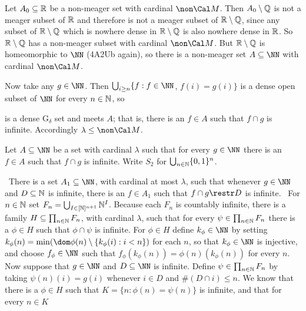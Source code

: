 {\medskip

 Let $A_0\subseteq\Bbb R$ be a non-meager set with cardinal
$\non\Cal M$.   Then $A_0\setminus\Bbb Q$ is not a meager subset of
$\Bbb R$ and therefore is not a meager subset of $\Bbb R\setminus\Bbb Q$,
since any subset of $\Bbb R\setminus\Bbb Q$ which is nowhere dense in
$\Bbb R\setminus\Bbb Q$ is also nowhere dense in $\Bbb R$.   So
$\Bbb R\setminus\Bbb Q$ has a non-meager subset with cardinal $\non\Cal M$.
But $\Bbb R\setminus\Bbb Q$ is homeomorphic to $\NN$ (4A2Ub again),
so there is a non-meager set $A\subseteq\NN$ with cardinal $\non\Cal M$.

Now take any $g\in\NN$.   Then
$\bigcup_{i\ge n}\{f:f\in\NN$, $f(i)=g(i)\}$ is a dense open subset of
$\NN$ for every $n\in\Bbb N$, so


\noindent is a dense G$_{\delta}$ set and meets $A$;  that is, there is an
$f\in A$ such that $f\cap g$ is infinite.   Accordingly
$\lambda\le\non\Cal M$.

\medskip

 Let $A\subseteq\NN$ be a set with cardinal $\lambda$ such that
for every $g\in\NN$
there is an $f\in A$ such that $f\cap g$ is infinite.   Write $S_2$ for
$\bigcup_{n\in\Bbb N}\{0,1\}^n$.

\medskip

\qquad\grheada\ There is a set $A_1\subseteq\NN$, with cardinal at most
$\lambda$, such
that whenever $g\in\NN$ and $D\subseteq\Bbb N$ is infinite, there is
an $f\in A_1$ such that $f\cap g\restr D$ is infinite.
\Prf\ For $n\in\Bbb N$ set $F_n=\bigcup_{I\in[\Bbb N]^{n+1}}\Bbb N^I$.
Because each $F_n$ is countably infinite, there is a family
$H\subseteq\prod_{n\in\Bbb N}F_n$, with cardinal $\lambda$, such that for every
$\psi\in\prod_{n\in\Bbb N}F_n$ there is a $\phi\in H$ such that
$\phi\cap\psi$ is infinite.   For $\phi\in H$ define
$k_{\phi}\in\NN$ by setting
$k_{\phi}(n)=\min(\dom \phi(n)\setminus\{k_{\phi}(i):i<n\})$ for each $n$, so
that $k_{\phi}\in\NN$ is injective, and choose $f_{\phi}\in\NN$ such that
$f_{\phi}(k_{\phi}(n))=\phi(n)(k_{\phi}(n))$ for every $n$.
Now suppose that $g\in\NN$ and $D\subseteq\NN$ is infinite.
Define $\psi\in\prod_{n\in\Bbb N}F_n$ by taking $\psi(n)(i)=g(i)$
whenever $i\in D$ and $\#(D\cap i)\le n$.   We know that there is a
$\phi\in H$ such that $K=\{n:\phi(n)=\psi(n)\}$ is infinite, and that for
every $n\in K$

}
